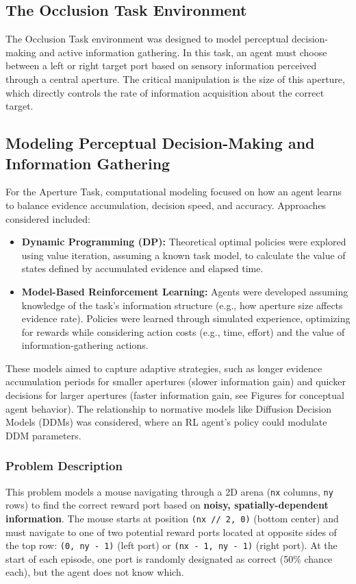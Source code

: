 
\subsection{The Occlusion Task Environment}
\label{ssec:methods_aperture_environment}
The Occlusion Task environment was designed to model perceptual decision-making and active information gathering. In this task, an agent must choose between a left or right target port based on sensory information perceived through a central aperture. The critical manipulation is the size of this aperture, which directly controls the rate of information acquisition about the correct target.

\subsection{Modeling Perceptual Decision-Making and Information Gathering}
\label{ssec:methods_aperture_task_agent_modeling}
For the Aperture Task, computational modeling focused on how an agent learns to balance evidence accumulation, decision speed, and accuracy. Approaches considered included:
\begin{itemize}
    \item \textbf{Dynamic Programming (DP):} Theoretical optimal policies were explored using value iteration, assuming a known task model, to calculate the value of states defined by accumulated evidence and elapsed time.
    \item \textbf{Model-Based Reinforcement Learning:} Agents were developed assuming knowledge of the task's information structure (e.g., how aperture size affects evidence rate). Policies were learned through simulated experience, optimizing for rewards while considering action costs (e.g., time, effort) and the value of information-gathering actions.
\end{itemize}
These models aimed to capture adaptive strategies, such as longer evidence accumulation periods for smaller apertures (slower information gain) and quicker decisions for larger apertures (faster information gain, see Figures for conceptual agent behavior). The relationship to normative models like Diffusion Decision Models (DDMs) was considered, where an RL agent's policy could modulate DDM parameters.

\subsubsection*{Problem Description}
This problem models a mouse navigating through a 2D arena (\texttt{nx} columns, \texttt{ny} rows) to find the correct reward port based on \textbf{noisy, spatially-dependent information}. The mouse starts at position \texttt{(nx // 2, 0)} (bottom center) and must navigate to one of two potential reward ports located at opposite sides of the top row: \texttt{(0, ny - 1)} (left port) or \texttt{(nx - 1, ny - 1)} (right port). At the start of each episode, one port is randomly designated as correct (50\% chance each), but the agent does not know which.

